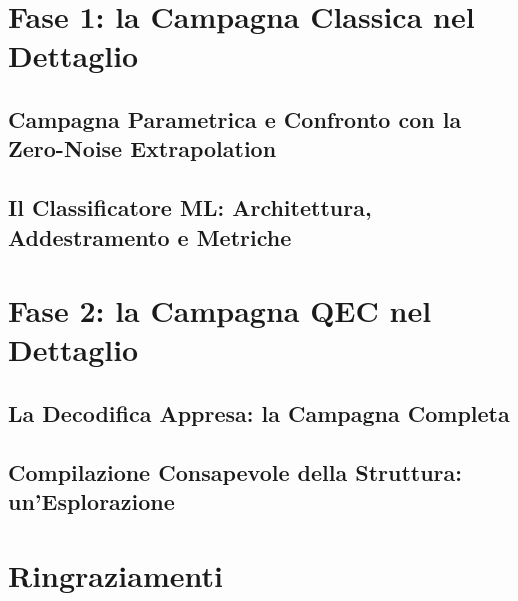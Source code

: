\documentclass[oneside, 12pt]{report}
\begin{document}
\chapter{Fase 1: la Campagna Classica nel Dettaglio}
\label{app:fase1}
\section{Campagna Parametrica e Confronto con la Zero-Noise Extrapolation}
\label{app:parametrica}

\section{Il Classificatore ML: Architettura, Addestramento e Metriche}
\label{app:classificatore}


\chapter{Fase 2: la Campagna QEC nel Dettaglio}
\label{app:fase2}
\section{La Decodifica Appresa: la Campagna Completa}
\label{app:decodifica}

\section{Compilazione Consapevole della Struttura: un'Esplorazione}
\label{app:compilazione}


\printbibliography[heading=bibintoc, title={Bibliografia}]

\chapter*{Ringraziamenti}

\end{document}
